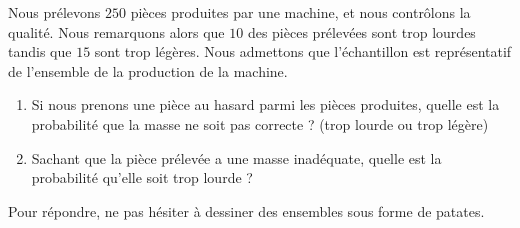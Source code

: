 
\begin{exercice}\label{exosmath-0396}

    Nous prélevons \( 250\) pièces produites par une machine, et nous contrôlons la qualité. Nous remarquons alors que \( 10\) des pièces prélevées sont trop lourdes tandis que \( 15\) sont trop légères. Nous admettons que l'échantillon est représentatif de l'ensemble de la production de la machine.

    \begin{enumerate}
        \item
            Si nous prenons une pièce au hasard parmi les pièces produites, quelle est la probabilité que la masse ne soit pas correcte ? (trop lourde ou trop légère)
        \item
            Sachant que la pièce prélevée a une masse inadéquate, quelle est la probabilité qu'elle soit trop lourde ?
    \end{enumerate}
    Pour répondre, ne pas hésiter à dessiner des ensembles sous forme de patates.

\end{exercice}
